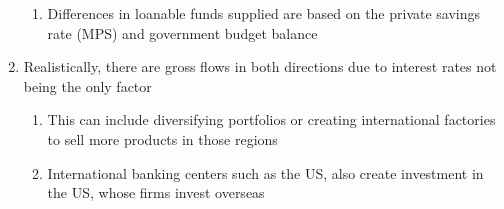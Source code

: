 \documentclass[11 pt, twoside]{article}
\begin{document}
\begin{enumerate}
\begin{enumerate}
\item Differences in loanable funds supplied are based on the private savings rate (MPS) and government budget balance
\end{enumerate}
\item Realistically, there are gross flows in both directions due to interest rates not being the only factor
\begin{enumerate}
\item This can include diversifying portfolios or creating international factories to sell more products in those regions
\item International banking centers such as the US, also create investment in the US, whose firms invest overseas
\end{enumerate}
\end{enumerate}
\end{document}
